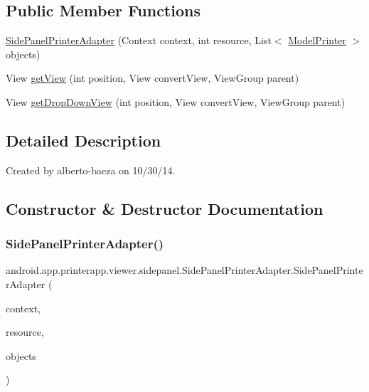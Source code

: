 \subsection*{Public Member Functions}
\begin{DoxyCompactItemize}
\item 
\hyperlink{classandroid_1_1app_1_1printerapp_1_1viewer_1_1sidepanel_1_1_side_panel_printer_adapter_a5486e3183ce3f13f6dd80e979eda5042}{Side\+Panel\+Printer\+Adapter} (Context context, int resource, List$<$ \hyperlink{classandroid_1_1app_1_1printerapp_1_1model_1_1_model_printer}{Model\+Printer} $>$ objects)
\item 
View \hyperlink{classandroid_1_1app_1_1printerapp_1_1viewer_1_1sidepanel_1_1_side_panel_printer_adapter_a592a59ed2fe22ab7234996b39378be73}{get\+View} (int position, View convert\+View, View\+Group parent)
\item 
View \hyperlink{classandroid_1_1app_1_1printerapp_1_1viewer_1_1sidepanel_1_1_side_panel_printer_adapter_acda1e4339b6f8a25d6f7748a642bde81}{get\+Drop\+Down\+View} (int position, View convert\+View, View\+Group parent)
\end{DoxyCompactItemize}


\subsection{Detailed Description}
Created by alberto-\/baeza on 10/30/14. 

\subsection{Constructor \& Destructor Documentation}
\mbox{\label{classandroid_1_1app_1_1printerapp_1_1viewer_1_1sidepanel_1_1_side_panel_printer_adapter_a5486e3183ce3f13f6dd80e979eda5042}} 
\subsubsection{\texorpdfstring{Side\+Panel\+Printer\+Adapter()}{SidePanelPrinterAdapter()}}
{\footnotesize\ttfamily android.\+app.\+printerapp.\+viewer.\+sidepanel.\+Side\+Panel\+Printer\+Adapter.\+Side\+Panel\+Printer\+Adapter (\begin{DoxyParamCaption}\item[{Context}]{context,  }\item[{int}]{resource,  }\item[{List$<$ \hyperlink{classandroid_1_1app_1_1printerapp_1_1model_1_1_model_printer}{Model\+Printer} $>$}]{objects }\end{DoxyParamCaption})}



